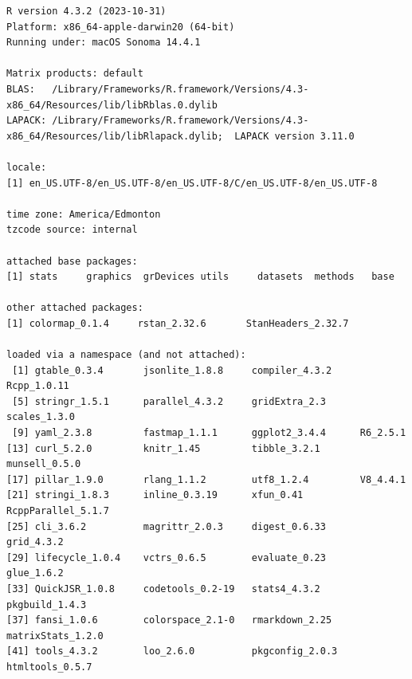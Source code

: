\documentclass[
  letterpaper,
  DIV=11,
  numbers=noendperiod]{scrartcl}
\begin{document}
\begin{verbatim}
R version 4.3.2 (2023-10-31)
Platform: x86_64-apple-darwin20 (64-bit)
Running under: macOS Sonoma 14.4.1

Matrix products: default
BLAS:   /Library/Frameworks/R.framework/Versions/4.3-x86_64/Resources/lib/libRblas.0.dylib 
LAPACK: /Library/Frameworks/R.framework/Versions/4.3-x86_64/Resources/lib/libRlapack.dylib;  LAPACK version 3.11.0

locale:
[1] en_US.UTF-8/en_US.UTF-8/en_US.UTF-8/C/en_US.UTF-8/en_US.UTF-8

time zone: America/Edmonton
tzcode source: internal

attached base packages:
[1] stats     graphics  grDevices utils     datasets  methods   base     

other attached packages:
[1] colormap_0.1.4     rstan_2.32.6       StanHeaders_2.32.7

loaded via a namespace (and not attached):
 [1] gtable_0.3.4       jsonlite_1.8.8     compiler_4.3.2     Rcpp_1.0.11       
 [5] stringr_1.5.1      parallel_4.3.2     gridExtra_2.3      scales_1.3.0      
 [9] yaml_2.3.8         fastmap_1.1.1      ggplot2_3.4.4      R6_2.5.1          
[13] curl_5.2.0         knitr_1.45         tibble_3.2.1       munsell_0.5.0     
[17] pillar_1.9.0       rlang_1.1.2        utf8_1.2.4         V8_4.4.1          
[21] stringi_1.8.3      inline_0.3.19      xfun_0.41          RcppParallel_5.1.7
[25] cli_3.6.2          magrittr_2.0.3     digest_0.6.33      grid_4.3.2        
[29] lifecycle_1.0.4    vctrs_0.6.5        evaluate_0.23      glue_1.6.2        
[33] QuickJSR_1.0.8     codetools_0.2-19   stats4_4.3.2       pkgbuild_1.4.3    
[37] fansi_1.0.6        colorspace_2.1-0   rmarkdown_2.25     matrixStats_1.2.0 
[41] tools_4.3.2        loo_2.6.0          pkgconfig_2.0.3    htmltools_0.5.7   
\end{verbatim}
\end{document}
